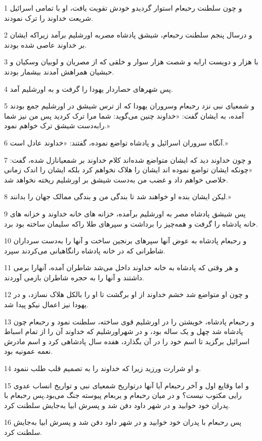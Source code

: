 \par 1 و چون سلطنت رحبعام استوار گردیدو خودش تقویت یافت، او با تمامی اسرائیل شریعت خداوند را ترک نمودند.
\par 2 و درسال پنجم سلطنت رحبعام، شیشق پادشاه مصربه اورشلیم برآمد زیراکه ایشان بر خداوند عاصی شده بودند.
\par 3 با هزار و دویست ارابه و شصت هزار سوار و خلقی که از مصریان و لوبیان وسکیان و حبشیان همراهش آمدند بیشمار بودند.
\par 4 پس شهرهای حصاردار یهودا را گرفت و به اورشلیم آمد.
\par 5 و شمعیای نبی نزد رحبعام وسروران یهودا که از ترس شیشق در اورشلیم جمع بودند آمده، به ایشان گفت: «خداوند چنین می‌گوید: شما مرا ترک کردید پس من نیز شما رابه‌دست شیشق ترک خواهم نمود.»
\par 6 آنگاه سروران اسرائیل و پادشاه تواضع نموده، گفتند: «خداوند عادل است.»
\par 7 و چون خداوند دید که ایشان متواضع شده‌اند کلام خداوند بر شمعیانازل شده، گفت: «چونکه ایشان تواضع نموده اند ایشان را هلاک نخواهم کرد بلکه ایشان را اندک زمانی خلاصی خواهم داد و غضب من به‌دست شیشق بر اورشلیم ریخته نخواهد شد.
\par 8 لیکن ایشان بنده او خواهند شد تا بندگی من و بندگی ممالک جهان را بدانند.»
\par 9 پس شیشق پادشاه مصر به اورشلیم برآمده، خزانه های خانه خداوند و خزانه های خانه پادشاه را گرفت و همه‌چیز را برداشت و سپرهای طلا راکه سلیمان ساخته بود برد.
\par 10 و رحبعام پادشاه به عوض آنها سپرهای برنجین ساخت و آنها را به‌دست سرداران شاطرانی که در خانه پادشاه رانگاهبانی می‌کردند سپرد.
\par 11 و هر وقتی که پادشاه به خانه خداوند داخل می‌شد شاطران آمده، آنهارا برمی داشتند و آنها را به حجره شاطران بازمی آوردند.
\par 12 و چون او متواضع شد خشم خداوند از او برگشت تا او را بالکل هلاک نسازد، و در یهودا نیز اعمال نیکو پیدا شد.
\par 13 و رحبعام پادشاه، خویشتن را در اورشلیم قوی ساخته، سلطنت نمود و رحبعام چون پادشاه شد چهل و یک ساله بود، و در شهراورشلیم که خداوند آن را از تمام اسباط اسرائیل برگزید تا اسم خود را در آن بگذارد، هفده سال پادشاهی کرد و اسم مادرش نعمه عمونیه بود.
\par 14 و او شرارت ورزید زیرا که خداوند را به تصمیم قلب طلب ننمود.
\par 15 و اما وقایع اول و آخر رحبعام آیا آنها درتواریخ شمعیای نبی و تواریخ انساب عدوی رایی مکتوب نیست؟ و در میان رحبعام و یربعام پیوسته جنگ می‌بود.پس رحبعام با پدران خود خوابید و در شهر داود دفن شد و پسرش ابیا به‌جایش سلطنت کرد.
\par 16 پس رحبعام با پدران خود خوابید و در شهر داود دفن شد و پسرش ابیا به‌جایش سلطنت کرد.
 

